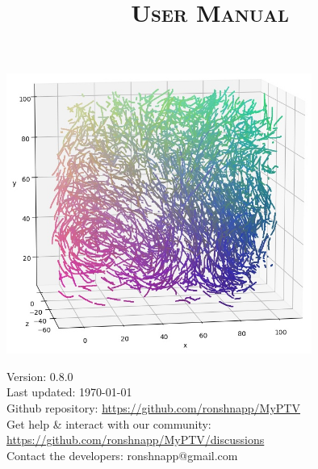 \documentclass[10pt,a4paper]{article}
\title{\Huge \sffamily \textsc{\textbf{User Manual}}}
\author{}%
\date{}
\begin{document}
	
	


	
\maketitle

\thispagestyle{empty}
\vspace{2.5cm}

\begin{center}
	\includegraphics[width=10cm]{traj_image.jpg}
\end{center}

\vfill

\begin{minipage}{14cm}
	{\small \sffamily
	Version: 0.8.0 \\
	Last updated: \today \\
	Github repository: \url{https://github.com/ronshnapp/MyPTV} \\
	Get help \& interact with our community: \url{https://github.com/ronshnapp/MyPTV/discussions}\\
	Contact the developers: ronshnapp@gmail.com}
\end{minipage}



\newpage
\tableofcontents
{}
\newpage









\end{document}

